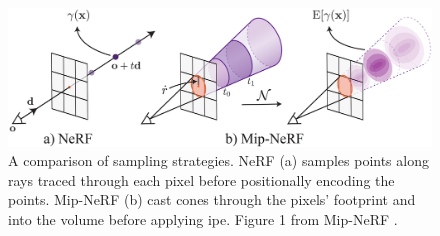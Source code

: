 \begin{figure}[ht]
    \centering
    \includegraphics[width=1.0\textwidth]{figures/mip-nerf-frustums.png}
    \caption[Illustration of positional encoding]{A comparison of sampling strategies. NeRF (a) samples points along rays traced through each pixel before positionally encoding the points. Mip-NeRF (b) cast cones through the pixels' footprint and into the volume before applying \acrshort{ipe}. Figure 1 from Mip-NeRF \cite{barron_mip-nerf_2021}.}
    \label{fig:mip-nerf-frustums}
\end{figure}